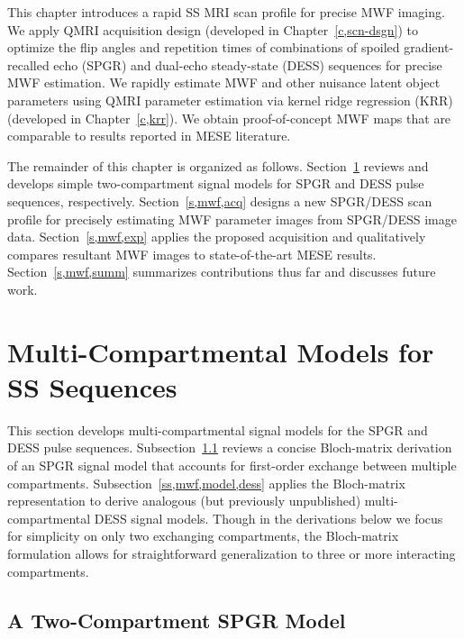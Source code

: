 This chapter introduces
a rapid SS MRI scan profile
for precise MWF imaging.
We apply QMRI acquisition design
(developed in Chapter~\ref{c,scn-dsgn})
to optimize the flip angles and repetition times
of combinations 
of spoiled gradient-recalled echo (SPGR)
\cite{zur:91:sot}
and dual-echo steady-state (DESS) 
\cite{redpath:88:fan, bruder:88:ans} sequences
for precise MWF estimation.
We rapidly estimate MWF and 
other nuisance latent object parameters
using QMRI parameter estimation
via kernel ridge regression (KRR)
(developed in Chapter~\ref{c,krr}).
We obtain proof-of-concept MWF maps \invivo
that are comparable
to results reported
in MESE literature.

The remainder of this chapter
is organized as follows.
Section~\ref{s,mwf,model} reviews and develops
simple two-compartment signal models
for SPGR and DESS pulse sequences, 
respectively.
Section~\ref{s,mwf,acq} designs 
a new SPGR/DESS scan profile 
for precisely estimating MWF parameter images
from SPGR/DESS image data.
Section~\ref{s,mwf,exp} applies
the proposed acquisition \invivo
and qualitatively compares resultant MWF images
to state-of-the-art MESE results.
Section~\ref{s,mwf,summ} summarizes contributions thus far
and discusses future work. 

\section{Multi-Compartmental Models for SS Sequences}
\label{s,mwf,model}

This section develops multi-compartmental signal models
for the SPGR and DESS pulse sequences.
Subsection~\ref{ss,mwf,model,spgr} reviews
a concise Bloch-matrix derivation \cite{spencer:00:mos}
of an SPGR signal model 
that accounts for first-order exchange 
between multiple compartments.
Subsection~\ref{ss,mwf,model,dess} applies 
the Bloch-matrix representation
to derive analogous 
(but previously unpublished)
multi-compartmental DESS signal models. 
Though in the derivations below
we focus for simplicity
on only two exchanging compartments,
the Bloch-matrix formulation allows
for straightforward generalization
to three or more interacting compartments.

\subsection{A Two-Compartment SPGR Model}
\label{ss,mwf,model,spgr}

